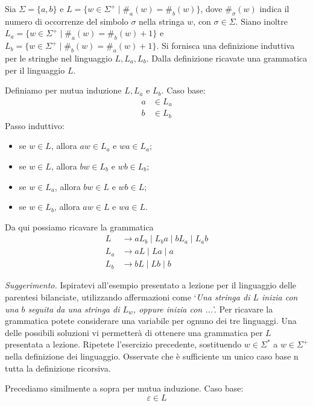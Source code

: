 \documentclass[12pt, answers]{exam}
\begin{document}
\begin{questions}
	\question Sia $\Sigma = \{a, b\}$ e $L = \{w \in \Sigma^+ \mid \#_a(w) = \#_b(w) \}$, dove $\#_\sigma(w)$ indica il numero di occorrenze del simbolo $\sigma$ nella stringa $w$, con $\sigma \in \Sigma$.
	Siano inoltre $L_a = \{w \in \Sigma^+ \mid \#_a(w) = \#_b(w) + 1 \}$ e $L_b = \{ w \in \Sigma^+ \mid \#_b(w) = \#_a(w) + 1 \}$.
	Si fornisca una definizione induttiva per le stringhe nel linguaggio $L, L_a, L_b$. Dalla definizione ricavate una grammatica per il linguaggio $L$.
	\begin{solution}
		Definiamo per mutua induzione $L, L_a$ e $L_b$.
		Caso base: 
		\begin{align*}
			a &\in L_a \\
			b &\in L_b 
		\end{align*}
		Passo induttivo:
		\begin{itemize}
			\item se $w \in L$, allora $aw \in L_a$ e $wa \in L_a$;
			\item se $w \in L$, allora $bw \in L_b$ e $wb \in L_b$;
			\item se $w \in L_a$, allora $bw \in L$ e $wb \in L$;
			\item se $w \in L_b$, allora $aw \in L$ e $wa \in L$.
		\end{itemize}
		Da qui possiamo ricavare la grammatica
		\begin{align*}
			L   &\rightarrow a L_b \mid L_b a \mid b L_a \mid L_a b \\
			L_a &\rightarrow a L \mid L a \mid a \\
			L_b &\rightarrow b L \mid L b \mid b
		\end{align*}
	\end{solution}
	\textit{Suggerimento.} Ispiratevi all'esempio presentato a lezione per il linguaggio delle parentesi bilanciate, utilizzando affermazioni come `\textit{Una stringa di $L$ inizia con una $b$ seguita da una stringa di $L_w$, oppure inizia con ...}'. 
	Per ricavare la grammatica potete considerare una variabile per ognuno dei tre linguaggi.
	Una delle possibili soluzioni vi permetterà di ottenere una grammatica per $L$ presentata a lezione.
	\question Ripetete l'esercizio precedente, sostituendo $w \in \Sigma^*$ a $w \in \Sigma^+$ nella definizione dei linguaggio. 
	Osservate che è sufficiente un unico caso base n tutta la definizione ricorsiva.
	\begin{solution}
		Precediamo similmente a sopra per mutua induzione.
		Caso base: 
		$$ \varepsilon \in L $$

\end{solution}
\end{questions}
\end{document}
